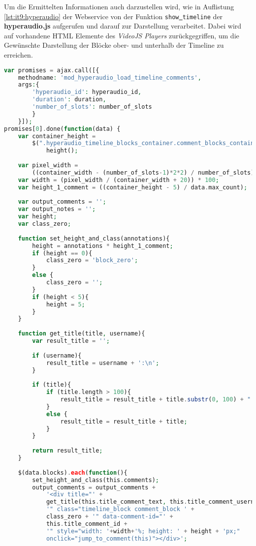 Um die Ermittelten Informationen auch darzustellen wird, wie in Auflistung \ref{lst:it9:hyperaudio} der Webservice von der Funktion \texttt{show\underline{{ }}timeline} der \textbf{hyperaudio.js} aufgerufen und darauf zur Darstellung verarbeitet. Dabei wird auf vorhandene HTML Elemente des \textit{VideoJS Players} zurückgegriffen, um die Gewünschte Darstellung der Blöcke ober- und unterhalb der Timeline zu erreichen.

\begin{lstlisting}[language=php,
             linewidth=\textwidth,
             caption={Ausschnitt der \textbf{hyperaudio.js} in der 9. Iteration},
             label={lst:it9:hyperaudio}]
var promises = ajax.call([{
    methodname: 'mod_hyperaudio_load_timeline_comments',
    args:{
        'hyperaudio_id': hyperaudio_id,
        'duration': duration,
        'number_of_slots': number_of_slots
        }
    }]);
promises[0].done(function(data) {
    var container_height =
        $(".hyperaudio_timeline_blocks_container.comment_blocks_container").
            height();
		    	
    var pixel_width = 
        ((container_width - (number_of_slots-1)*2*2) / number_of_slots);
    var width = (pixel_width / (container_width + 20)) * 100;
    var height_1_comment = ((container_height - 5) / data.max_count);
		    	
    var output_comments = '';
    var output_notes = '';
    var height;
    var class_zero;
		    	
    function set_height_and_class(annotations){
        height = annotations * height_1_comment;
        if (height == 0){
            class_zero = 'block_zero';
        }
        else {
            class_zero = '';
        }
        if (height < 5){
            height = 5;
        }
    }
		    	
    function get_title(title, username){
        var result_title = '';
		    		
        if (username){
            result_title = username + ':\n';
        }
		    		
        if (title){
            if (title.length > 100){
                result_title = result_title + title.substr(0, 100) + " ...";
            }
            else {
                result_title = result_title + title;
            }
        }
		    		
        return result_title;
    }
		    	
    $(data.blocks).each(function(){
        set_height_and_class(this.comments);
        output_comments = output_comments + 
            '<div title="' + 
            get_title(this.title_comment_text, this.title_comment_username) +
            '" class="timeline_block comment_block ' + 
            class_zero + '" data-comment-id="' + 
            this.title_comment_id + 
            '" style="width: '+width+'%; height: ' + height + 'px;"
            onclick="jump_to_comment(this)"></div>';
                

\end{lstlisting}
